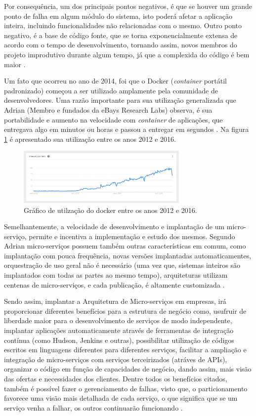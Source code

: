 \documentclass[journal]{IEEEtran}
\begin{document}
Por consequência, um dos principais pontos negativos, é que se houver um grande ponto de falha em algum módulo do sistema, isto poderá afetar a aplicação inteira, incluindo funcionalidades não relacionadas com o mesmo. Outro ponto negativo, é a base de código fonte, que se torna exponencialmente extensa de acordo com o tempo de desenvolvimento, tornando assim, novos membros do projeto improdutivo durante algum tempo, já que a complexida do código é bem maior \cite{AdrianoAlmeida}.

Um fato que ocorreu no ano de 2014, foi que o Docker (\emph{container} portátil padronizado) começou a ser utilizado amplamente pela comunidade de desenvolvedores. Uma razão importante para sua utilização generalizada que Adrian (Membro e fundados da eBays Research Labs) observa, é sua portabilidade e aumento na velocidade com \emph{container} de aplicações, que entregava algo em minutos ou horas e passou a entregar em segundos \cite{CristianoDiedrich}. Na figura \ref{fig:utilizacao-docker} é apresentado sua utilização entre os anos 2012 e 2016.

\begin{figure}[h]
\centering
\includegraphics[height=1.1in]{docker}
\caption{Gráfico de utilzação do docker entre os anos 2012 e 2016.}
\label{fig:utilizacao-docker}
\end{figure}

Semelhantemente, a velocidade de desenvolvimento e implantação de um micro-serviço, permite e incentiva a implementação e estudo dos mesmos. Segundo Adrian micro-serviços possuem também outras características em comum, como implantação com pouca frequência, novas versões implantadas automaticamentes, orquestração de uso geral não é necessário (uma vez que, sistemas inteiros são implantados com todas as partes ao mesmo tempo), arquiteturas utilizam centenas de micro-serviços, e cada publicação, é altamente customizada \cite{JanStenberg}.

Sendo assim, implantar a Arquitetura de Micro-serviços em empresas, irá proporcionar diferentes benefícios para a estrutura de negócio como, usufruir de liberdade maior para o desenvolvimento de serviços de modo independente, implantar aplicações automaticamente através de ferramentas de integração contínua (como Hudson, Jenkins e outras), possibilitar utilização de códigos escritos em linguagens diferentes para diferentes serviços, facilitar a ampliação e integração de micro-serviços com serviços terceirizados (atráves de APIs), organizar o código em função de capacidades de negócio, dando assim, mais visão das ofertas e necessidades dos clientes. Dentre todos os benefícios citados, também é possível fazer o gerenciamento de falhas, visto que, o particionamento favorece uma visão mais detalhada de cada serviço, o que significa que se um serviço venha a falhar, os outros continuarão funcionando \cite{RicardoPeloi}.
\end{document}

